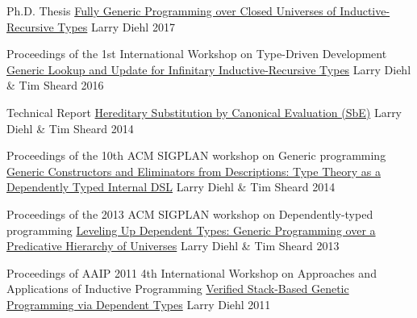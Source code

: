 

\begin{cventries}

  \cventry
    {Ph.D. Thesis} %
    {\href{https://github.com/larrytheliquid/thesis}{Fully Generic Programming over Closed Universes of Inductive-Recursive Types}} %
    {Larry Diehl} %
    {2017} %
    {}

  \cventry
    {Proceedings of the 1st International Workshop on Type-Driven Development} %
    {\href{https://github.com/larrytheliquid/infir}{Generic Lookup and Update for Infinitary Inductive-Recursive Types}} %
    {Larry Diehl \& Tim Sheard} %
    {2016} %
    {}

  \cventry
    {Technical Report} %
    {\href{https://github.com/larrytheliquid/sbe}{Hereditary Substitution by Canonical Evaluation (SbE)}} %
    {Larry Diehl \& Tim Sheard} %
    {2014} %
    {}

  \cventry
    {Proceedings of the 10th ACM SIGPLAN workshop on Generic programming} %
    {\href{https://github.com/larrytheliquid/generic-elim}{Generic Constructors and Eliminators from Descriptions: {\tiny Type Theory as a Dependently Typed Internal DSL}}} %
    {Larry Diehl \& Tim Sheard} %
    {2014} %
    {}


  \cventry
    {Proceedings of the 2013 ACM SIGPLAN workshop on Dependently-typed programming} %
    {\href{https://github.com/larrytheliquid/leveling-up}{Leveling Up Dependent Types: {\tiny Generic Programming over a Predicative Hierarchy of Universes}}} %
    {Larry Diehl \& Tim Sheard} %
    {2013} %
    {}

  \cventry
    {Proceedings of AAIP 2011 4th International Workshop on Approaches and Applications of Inductive Programming} %
    {\href{https://github.com/larrytheliquid/aaip11}{Verified Stack-Based Genetic Programming via Dependent Types}} %
    {Larry Diehl} %
    {2011} %
    {}

\end{cventries}
